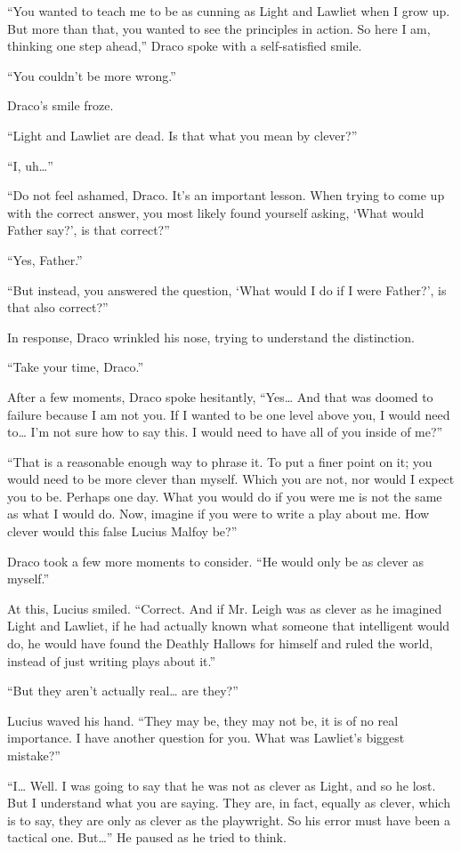 “You wanted to teach me to be as cunning as Light and Lawliet when I grow up. But more than that, you wanted to see the principles in action. So here I am, thinking one step ahead,” Draco spoke with a self-satisfied smile.

“You couldn’t be more wrong.”

Draco’s smile froze.

“Light and Lawliet are dead. Is that what you mean by clever?”

“I, uh…”

“Do not feel ashamed, Draco. It’s an important lesson. When trying to come up with the correct answer, you most likely found yourself asking, ‘What would Father say?’, is that correct?”

“Yes, Father.”

“But instead, you answered the question, ‘What would I do if I were Father?’, is that also correct?”

In response, Draco wrinkled his nose, trying to understand the distinction.

“Take your time, Draco.”

After a few moments, Draco spoke hesitantly, “Yes… And that was doomed to failure because I am not you. If I wanted to be one level above you, I would need to… I’m not sure how to say this. I would need to have all of you inside of me?”

“That is a reasonable enough way to phrase it. To put a finer point on it; you would need to be more clever than myself. Which you are not, nor would I expect you to be. Perhaps one day. What you would do if you were me is not the same as what I would do. Now, imagine if you were to write a play about me. How clever would this false Lucius Malfoy be?”

Draco took a few more moments to consider. “He would only be as clever as myself.”

At this, Lucius smiled. “Correct. And if Mr. Leigh was as clever as he imagined Light and Lawliet, if he had actually known what someone that intelligent would do, he would have found the Deathly Hallows for himself and ruled the world, instead of just writing plays about it.”

“But they aren’t actually real… are they?”

Lucius waved his hand. “They may be, they may not be, it is of no real importance. I have another question for you. What was Lawliet’s biggest mistake?”

“I… Well. I was going to say that he was not as clever as Light, and so he lost. But I understand what you are saying. They are, in fact, equally as clever, which is to say, they are only as clever as the playwright. So his error must have been a tactical one. But…” He paused as he tried to think.

